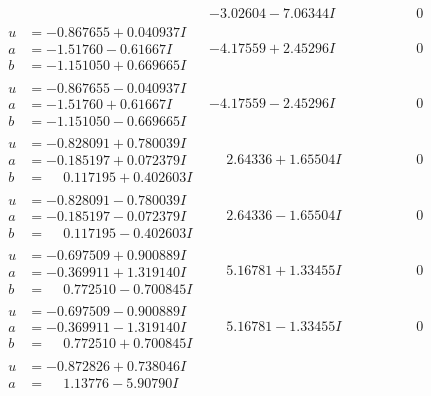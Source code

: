 \documentclass[1p]{elsarticle_modified}
\theoremstyle{definition}
\begin{document}
$$\begin{array}{c|c|c}
 & -3.02604 - 7.06344 I & \phantom{-0.000000 } 0 \\ \hline\begin{aligned}
u &= -0.867655 + 0.040937 I \\
a &= -1.51760 - 0.61667 I \\
b &= -1.151050 + 0.669665 I\end{aligned}
 & -4.17559 + 2.45296 I & \phantom{-0.000000 } 0 \\ \hline\begin{aligned}
u &= -0.867655 - 0.040937 I \\
a &= -1.51760 + 0.61667 I \\
b &= -1.151050 - 0.669665 I\end{aligned}
 & -4.17559 - 2.45296 I & \phantom{-0.000000 } 0 \\ \hline\begin{aligned}
u &= -0.828091 + 0.780039 I \\
a &= -0.185197 + 0.072379 I \\
b &= \phantom{-}0.117195 + 0.402603 I\end{aligned}
 & \phantom{-}2.64336 + 1.65504 I & \phantom{-0.000000 } 0 \\ \hline\begin{aligned}
u &= -0.828091 - 0.780039 I \\
a &= -0.185197 - 0.072379 I \\
b &= \phantom{-}0.117195 - 0.402603 I\end{aligned}
 & \phantom{-}2.64336 - 1.65504 I & \phantom{-0.000000 } 0 \\ \hline\begin{aligned}
u &= -0.697509 + 0.900889 I \\
a &= -0.369911 + 1.319140 I \\
b &= \phantom{-}0.772510 - 0.700845 I\end{aligned}
 & \phantom{-}5.16781 + 1.33455 I & \phantom{-0.000000 } 0 \\ \hline\begin{aligned}
u &= -0.697509 - 0.900889 I \\
a &= -0.369911 - 1.319140 I \\
b &= \phantom{-}0.772510 + 0.700845 I\end{aligned}
 & \phantom{-}5.16781 - 1.33455 I & \phantom{-0.000000 } 0 \\ \hline\begin{aligned}
u &= -0.872826 + 0.738046 I \\
a &= \phantom{-}1.13776 - 5.90790 I \\

\end{aligned}
\end{array}$$
\end{document}
